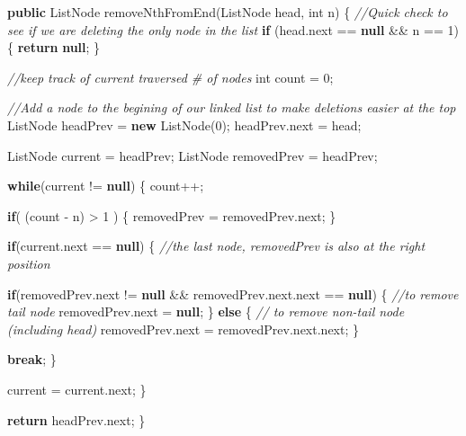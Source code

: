 \documentclass[]{book}
\newenvironment{Shaded}{\begin{snugshade}}{\end{snugshade}}
\newcommand{\CommentTok}[1]{\textcolor[rgb]{0.56,0.35,0.01}{\textit{#1}}}
\newcommand{\DataTypeTok}[1]{\textcolor[rgb]{0.13,0.29,0.53}{#1}}
\newcommand{\DecValTok}[1]{\textcolor[rgb]{0.00,0.00,0.81}{#1}}
\newcommand{\FunctionTok}[1]{\textcolor[rgb]{0.00,0.00,0.00}{#1}}
\newcommand{\KeywordTok}[1]{\textcolor[rgb]{0.13,0.29,0.53}{\textbf{#1}}}
\newcommand{\NormalTok}[1]{#1}
\begin{document}
\begin{Shaded}
\begin{Highlighting}[]
\KeywordTok{public}\NormalTok{ ListNode }\FunctionTok{removeNthFromEnd}\NormalTok{(ListNode head, }\DataTypeTok{int}\NormalTok{ n) \{}
    \CommentTok{//Quick check to see if we are deleting the only node in the list}
    \KeywordTok{if}\NormalTok{ (head.}\FunctionTok{next}\NormalTok{ == }\KeywordTok{null}\NormalTok{ && n == }\DecValTok{1}\NormalTok{)\{}
        \KeywordTok{return} \KeywordTok{null}\NormalTok{;}
\NormalTok{    \}}

    \CommentTok{//keep track of current traversed # of nodes}
    \DataTypeTok{int}\NormalTok{ count = }\DecValTok{0}\NormalTok{;}

    \CommentTok{//Add a node to the begining of our linked list to make deletions easier at the top}
\NormalTok{    ListNode headPrev = }\KeywordTok{new} \FunctionTok{ListNode}\NormalTok{(}\DecValTok{0}\NormalTok{);}
\NormalTok{    headPrev.}\FunctionTok{next}\NormalTok{ = head;}

\NormalTok{    ListNode current = headPrev;}
\NormalTok{    ListNode removedPrev = headPrev;}

    \KeywordTok{while}\NormalTok{(current != }\KeywordTok{null}\NormalTok{) \{}
\NormalTok{        count++;}

        \KeywordTok{if}\NormalTok{( (count - n) > }\DecValTok{1}\NormalTok{ ) \{}
\NormalTok{            removedPrev = removedPrev.}\FunctionTok{next}\NormalTok{;}
\NormalTok{        \}}

        \KeywordTok{if}\NormalTok{(current.}\FunctionTok{next}\NormalTok{ == }\KeywordTok{null}\NormalTok{) \{}
            \CommentTok{//the last node, removedPrev is also at the right position}

            \KeywordTok{if}\NormalTok{(removedPrev.}\FunctionTok{next}\NormalTok{ != }\KeywordTok{null}\NormalTok{ && removedPrev.}\FunctionTok{next}\NormalTok{.}\FunctionTok{next}\NormalTok{ == }\KeywordTok{null}\NormalTok{) \{}
                \CommentTok{//to remove tail node}
\NormalTok{                removedPrev.}\FunctionTok{next}\NormalTok{ = }\KeywordTok{null}\NormalTok{;}
\NormalTok{            \} }\KeywordTok{else}\NormalTok{ \{}
                \CommentTok{// to remove non-tail node (including head)}
\NormalTok{                removedPrev.}\FunctionTok{next}\NormalTok{ = removedPrev.}\FunctionTok{next}\NormalTok{.}\FunctionTok{next}\NormalTok{;}
\NormalTok{            \}}

            \KeywordTok{break}\NormalTok{;}
\NormalTok{        \}}

\NormalTok{        current = current.}\FunctionTok{next}\NormalTok{;}
\NormalTok{    \}}

    \KeywordTok{return}\NormalTok{ headPrev.}\FunctionTok{next}\NormalTok{;}
\NormalTok{\}}
\end{Highlighting}
\end{Shaded}
\end{document}
